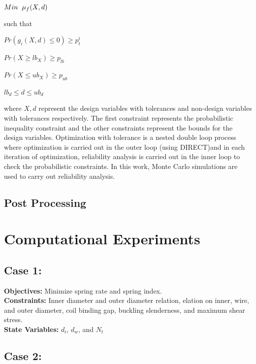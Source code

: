 \documentclass[10pt]{article}
\begin{document}
\centerline{$Min \hspace{2mm} \mu_{f} (X,d)$}

such that

\centerline{$Pr(g_{i}(X,d) \leq 0)\geq p_{t}^{i}$}
\centerline{$Pr(X \geq lb_{X})\geq p_{lb}$}
\centerline{$Pr(X \leq ub_{X})\geq p_{ub}$}
\centerline{$lb_{d} \leq d \leq ub_{d}$}

\noindent where $X,d$ represent the design variables with tolerances and non-design variables with tolerances respectively. The first constraint represents the probabilistic inequality constraint and the other constraints represent the bounds for the design variables. Optimization with tolerance is a nested double loop process where optimization is carried out in the outer loop (using DIRECT)and in each iteration of optimization, reliability analysis is carried out in the inner loop to check the probabilistic constraints. In this work, Monte Carlo simulations are used to carry out reliability analysis. 

\cite{Derivative} \cite{DirectPaper} \cite{MATLAB:2014a} \cite{DirectUserGuide}
 
 \subsection{Post Processing}

\section{Computational Experiments}
\label{sec:Computational_Experiments}


\newpage
\subsection{Case 1:}
\label{sec:Case1}
	\textbf{Objectives:} Minimize spring rate and spring index.\\
	\textbf{Constraints:} Inner diameter and outer diameter relation, elation on inner, wire, and outer diameter, coil binding gap, buckling slenderness, and maximum shear stress. \\
	\textbf{State Variables:} $d_{i}$, $d_{w}$, and $N_{t}$ \\

\newpage
\subsection{Case 2:}
\label{sec:Case2}
\end{document}

